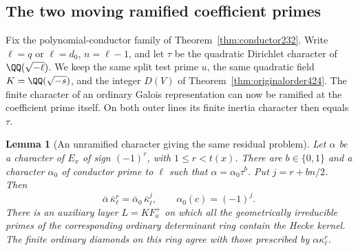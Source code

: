 \documentclass[a4paper,11pt]{article}
\newtheorem{lemma}[proposition]{Lemma}
\theoremstyle{definition}
\theoremstyle{remark}
\numberwithin{equation}{section}
\begin{document}
\subsection{The two moving ramified coefficient primes}
\label{sec:movingcoefficient428}

Fix the polynomial-conductor family of
Theorem~\ref{thm:conductor232}. Write \(\ell=q\) or \(\ell=d_0\),
\(n=\ell-1\), and let \(\tau\) be the quadratic Dirichlet
character of \(\QQ(\sqrt{-\ell})\). We keep the same split test
prime \(u\), the same quadratic field \(K=\QQ(\sqrt{-s})\), and
the integer \(D(V)\) of Theorem~\ref{thm:originalorder424}.
The finite character of an ordinary Galois representation can
now be ramified at the coefficient prime itself. On both outer
lines its finite inertia character then equals \(\tau\).

\begin{lemma}[An unramified character giving the same residual problem]\leavevmode
\label{lem:quadraticseed428}
Let \(\alpha\) be a character of \(E_x\) of sign \((-1)^r\),
with \(1\le r<t(x)\). There are \(b\in\{0,1\}\) and a character
\(\alpha_0\) of conductor prime to \(\ell\) such that
\(\alpha=\alpha_0\tau^b\). Put \(j=r+bn/2\). Then
\[
       \bar\alpha\,\bar\kappa_\ell^r
        =\bar\alpha_0\,\bar\kappa_\ell^j,\qquad
       \alpha_0(c)=(-1)^j .
\]
There is an auxiliary layer \(L=KF_a^+\) on which all the
geometrically irreducible primes of the corresponding ordinary
determinant ring contain the Hecke kernel. The finite ordinary
diamonds on this ring agree with those prescribed by
\(\alpha\kappa_\ell^r\).
\end{lemma}
\end{document}
